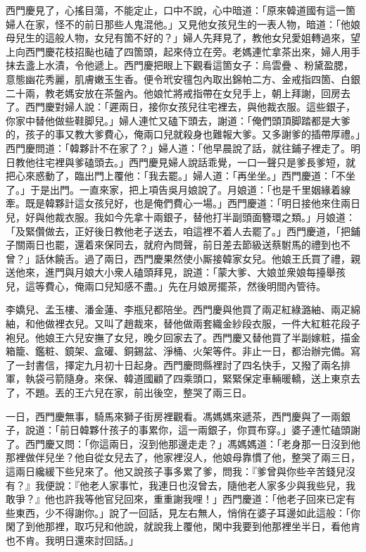 西門慶見了，心搖目蕩，不能定止，口中不說，心中暗道：「原來韓道國有這一箇婦人在家，怪不的前日那些人鬼混他。」{}又見他女孩兒生的一表人物，暗道：「他娘母兒生的這般人物，女兒有箇不好的？」婦人先拜見了，教他女兒愛姐轉過來，望上向西門慶花枝招颭也磕了四箇頭，起來侍立在旁。老媽連忙拿茶出來，婦人用手抹去盞上水漬，令他遞上。西門慶把眼上下觀看這箇女子：烏雲疊𩬆、粉黛盈腮，意態幽花秀麗，肌膚嫩玉生香。便令玳安氊包內取出錦帕二方、金戒指四箇、白銀二十兩，教老媽安放在茶盤內。他娘忙將戒指帶在女兒手上，朝上拜謝，回房去了。西門慶對婦人說：「遲兩日，接你女孩兒往宅裡去，與他裁衣服。這些銀子，你家中替他做些鞋脚兒。」婦人連忙又磕下頭去，謝道：「俺們頭頂脚踏都是大爹的，孩子的事又教大爹費心，俺兩口兒就殺身也難報大爹。{}又多謝爹的插帶厚禮。」西門慶問道：「韓夥計不在家了？」婦人道：「他早晨說了話，就往鋪子裡走了。明日教他往宅裡與爹磕頭去。」西門慶見婦人說話乖覺，一口一聲只是爹長爹短，就把心來惑動了，臨出門上覆他：「我去罷。」婦人道：「再坐坐。」西門慶道：「不坐了。」{}于是出門。一直來家，把上項告吳月娘說了。月娘道：「也是千里姻緣着線牽。既是韓夥計這女孩兒好，也是俺們費心一場。」西門慶道：「明日接他來住兩日兒，好與他裁衣服。我如今先拿十兩銀子，替他打半副頭面簪環之類。」月娘道：「及緊儹做去，正好後日教他老子送去，咱這裡不着人去罷了。」西門慶道，「把鋪子關兩日也罷，還着來保同去，就府內問聲，前日差去節級送蔡駙馬的禮到也不曾？」話休饒舌。過了兩日，西門慶果然使小厮接韓家女兒。他娘王氏買了禮，親送他來，進門與月娘大小衆人磕頭拜見，說道：「蒙大爹、大娘並衆娘每擡舉孩兒，這等費心，俺兩口兒知感不盡。」先在月娘房擺茶，然後明間內管待。

李嬌兒、孟玉樓、潘金蓮、李瓶兒都陪坐。西門慶與他買了兩疋紅綠潞紬、兩疋綿紬，和他做裡衣兒。又叫了趙裁來，替他做兩套織金紗段衣服，一件大紅粧花段子袍兒。他娘王六兒安撫了女兒，晚夕回家去了。西門慶又替他買了半副嫁粧，描金箱籠、鑑粧、鏡架、盒礶、銅錫盆、淨桶、火架等件。非止一日，都治辦完備。寫了一封書信，擇定九月初十日起身。西門慶問縣裡討了四名快手，又撥了兩名排軍，執袋弓箭隨身。來保、韓道國顧了四乘頭口，緊緊保定車輛暖轎，送上東京去了，不題。丟的王六兒在家，前出後空，整哭了兩三日。

一日，西門慶無事，騎馬來獅子街房裡觀看。馮媽媽來遞茶，西門慶與了一兩銀子，說道：「前日韓夥什孩子的事累你，這一兩銀子，你買布穿。」婆子連忙磕頭謝了。西門慶又問：「你這兩日，沒到他那邊走走？」馮媽媽道：「老身那一日沒到他那裡做伴兒坐？他自從女兒去了，他家裡沒人，他娘母靠慣了他，整哭了兩三日，這兩日纔緩下些兒來了。他又說孩子事多累了爹，問我：『爹曾與你些辛苦錢兒沒有？』我便說：『他老人家事忙，我連日也沒曾去，隨他老人家多少與我些兒，我敢爭？』他也許我等他官兒回來，重重謝我哩！」西門慶道：「他老子回來已定有些東西，少不得謝你。」說了一回話，見左右無人，悄俏在婆子耳邊如此這般：「你閑了到他那裡，取巧兒和他說，就說我上覆他，閑中我要到他那裡坐半日，看他肯也不肯。我明日還來討回話。」

